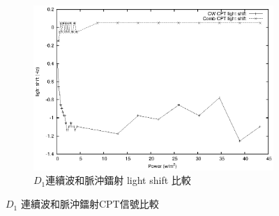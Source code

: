 \documentclass[11pt,a4paper]{article}
\begin{document}
\begin{figure}
\begin{subfigure}[b]{0.6\textwidth}
\includegraphics[width=\textwidth]{d1_cw_p/lightshift.eps}
\caption{$D_1$連續波和脈沖鐳射 light shift 比較}
\label{fig:d1lightshift}
\end{subfigure}
\caption{$D_1$ 連續波和脈沖鐳射CPT信號比較}
\label{fig:cwpd1}
\end{figure}
\end{document}
